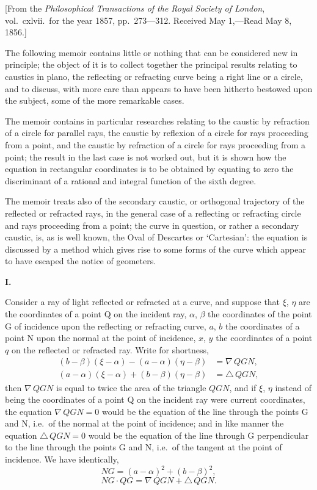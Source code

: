 \documentclass[11pt,a4paper]{article}
\begin{document}
[From the \textit{Philosophical Transactions of the Royal Society of London}, vol.~cxlvii.\ for the
year 1857, pp.~273---312. Received May 1,---Read May 8, 1856.]

\bigskip

The following memoir contains little or nothing that can be considered new in
principle; the object of it is to collect together the principal results relating to
caustics in plano, the reflecting or refracting curve being a right line or a circle,
and to discuss, with more care than appears to have been hitherto bestowed upon
the subject, some of the more remarkable cases.

The memoir contains in particular researches relating to the caustic by refraction
of a circle for parallel rays, the caustic by reflexion of a circle for rays proceeding
from a point, and the caustic by refraction of a circle for rays proceeding from a
point; the result in the last case is not worked out, but it is shown how the
equation in rectangular coordinates is to be obtained by equating to zero the
discriminant of a rational and integral function of the sixth degree.

The memoir treats also of the secondary caustic, or orthogonal trajectory of the
reflected or refracted rays, in the general case of a reflecting or refracting circle
and rays proceeding from a point; the curve in question, or rather a secondary
caustic, is, as is well known, the Oval of Descartes or `Cartesian': the equation is
discussed by a method which gives rise to some forms of the curve which appear
to have escaped the notice of geometers.

\medskip
\noindent\textbf{I.}

Consider a ray of light reflected or refracted at a curve, and suppose that
$\xi$, $\eta$ are the coordinates of a point Q on the incident ray, $\alpha$, $\beta$ the coordinates
of the point G of incidence upon the reflecting or refracting curve, $a$, $b$ the
coordinates of a point N upon the normal at the point of incidence, $x$, $y$ the
coordinates of a point $q$ on the reflected or refracted ray. Write for shortness,
\begin{align*}
(b-\beta)(\xi-\alpha) - (a-\alpha)(\eta-\beta) &= \nabla\,QGN,\\
(a-\alpha)(\xi-\alpha) + (b-\beta)(\eta-\beta) &= \triangle\,QGN,
\end{align*}
then $\nabla\,QGN$ is equal to twice the area of the triangle $QGN$, and if $\xi$,
$\eta$ instead of being the coordinates of a point Q on the incident ray were current
coordinates, the equation $\nabla\,QGN = 0$ would be the equation of the line through
the points G and N, i.e.\ of the normal at the point of incidence; and in like
manner the equation $\triangle\,QGN = 0$ would be the equation of the line through G
perpendicular to the line through the points G and N, i.e.\ of the tangent at the
point of incidence. We have identically,
\[NG = (a-\alpha)^2 + (b-\beta)^2,\]
\[NG \cdot QG = \nabla\,QGN + \triangle\,QGN.\]
\end{document}
